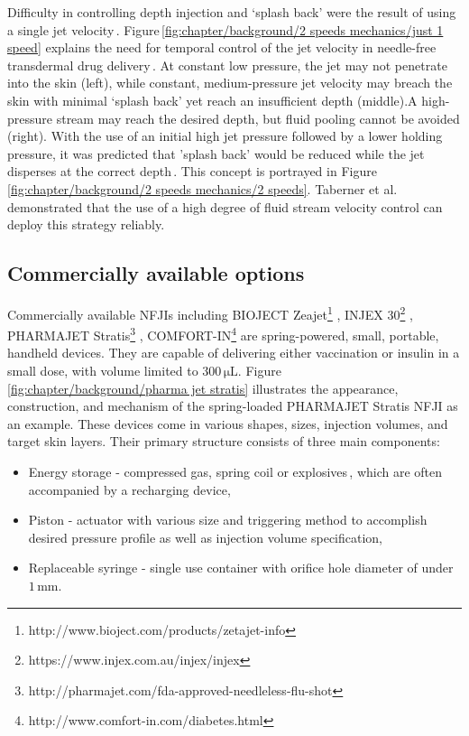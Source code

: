         
        Difficulty in controlling depth injection and ‘splash back’ were the result of using a single jet velocity\,\cite{schramm2002}. Figure\,\ref{fig:chapter/background/2 speeds mechanics/just 1 speed} explains the need for temporal control of the jet velocity in needle-free transdermal drug delivery\,\cite{Mitragotri2005}. At constant low pressure, the jet may not penetrate into the skin (left), while constant, medium-pressure jet velocity may breach the skin with minimal ‘splash back’ yet reach an insufficient depth (middle).A high-pressure stream may reach the desired depth, but fluid pooling cannot be avoided (right). With the use of an initial high jet pressure followed by a lower holding pressure, it was predicted that ’splash back’ would be reduced while the jet disperses at the correct depth\,\cite{wendell2006}. This concept is portrayed in Figure\,\ref{fig:chapter/background/2 speeds mechanics/2 speeds}. Taberner et al.\,\cite{taberner2012} demonstrated that the use of a high degree of fluid stream velocity control can deploy this strategy reliably.
    
    
    \subsection{Commercially available options}     \label{Chapter:background/needle-free jet injection/commercially available options}
        
        Commercially available \acsp{NFJI} including BIOJECT Zeajet\footnote{http://www.bioject.com/products/zetajet-info} , INJEX 30\footnote{https://www.injex.com.au/injex/injex} , PHARMAJET Stratis\footnote{http://pharmajet.com/fda-approved-needleless-flu-shot} , COMFORT-IN\footnote{http://www.comfort-in.com/diabetes.html}  are spring-powered, small, portable, handheld devices. They are capable of delivering either vaccination or insulin in a small dose, with volume limited to $\mathrm{300\,\mu L}$. Figure\,\ref{fig:chapter/background/pharma jet stratis} illustrates the appearance, construction, and mechanism of the spring-loaded PHARMAJET Stratis NFJI as an example. These devices come in various shapes, sizes, injection volumes, and target skin layers. Their primary structure consists of three main components:
        \begin{itemize}
            \item Energy storage - compressed gas, spring coil or explosives\,\cite{taberner2012}, which are often accompanied by a recharging device,
            \item Piston - actuator with various size and triggering method to accomplish desired pressure profile as well as injection volume specification,
            \item Replaceable syringe - single use container with orifice hole diameter of under $\mathrm{1\,mm}$.
        \end{itemize}
        
